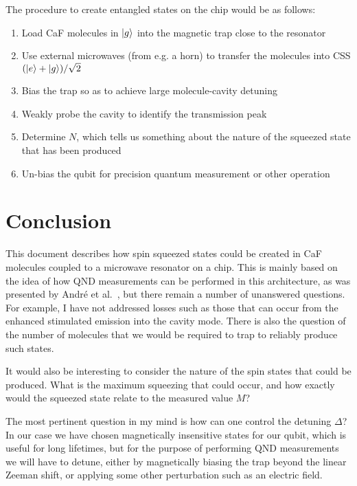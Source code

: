 The procedure to create entangled states on the chip would be as follows:

\begin{enumerate}
  \item Load CaF molecules in $\ket{g}$ into the magnetic trap close to the
    resonator
  \item Use external microwaves (from e.g. a horn) to transfer the molecules
    into CSS $(\ket{e} + \ket{g})/\sqrt{2}$
  \item Bias the trap so as to achieve large molecule-cavity detuning
  \item Weakly probe the cavity to identify the transmission peak
  \item Determine $N$, which tells us something about the nature of the
    squeezed state that has been produced
  \item Un-bias the qubit for precision quantum measurement or other operation
\end{enumerate}

\section{Conclusion}

This document describes how spin squeezed states could be created in CaF
molecules coupled to a microwave resonator on a chip. This is mainly based on
the idea of how QND measurements can be performed in this architecture, as was
presented by Andr\'e et al.~\cite{Andre2006}, but there remain a number of
unanswered questions. For example, I have not addressed losses such as those
that can occur from the enhanced stimulated emission into the cavity mode.
There is also the question of the number of molecules that we would be required
to trap to reliably produce such states.

It would also be interesting to consider the nature of the spin states that
could be produced. What is the maximum squeezing that could occur, and how
exactly would the squeezed state relate to the measured value $M$?

The most pertinent question in my mind is how can one control the detuning
$\Delta$? In our case we have chosen magnetically insensitive states for our
qubit, which is useful for long lifetimes, but for the purpose of performing
QND measurements we will have to detune, either by magnetically biasing the
trap beyond the linear Zeeman shift, or applying some other perturbation
such as an electric field.


